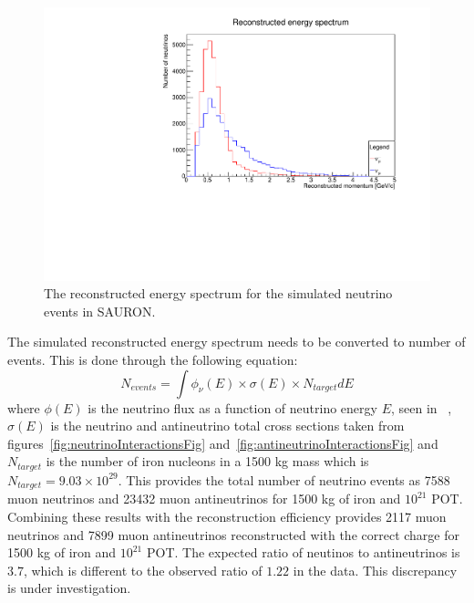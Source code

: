 \begin{figure}[h!]
\centering
\includegraphics[width=.9\textwidth]{figures/NeutrinoChap/ReconstructedESpectrum.pdf}
\caption{The reconstructed energy spectrum for the simulated neutrino events in SAURON.}
\label{fig:SimuSpectrum}
\end{figure}

The simulated reconstructed energy spectrum needs to be converted to number of events. This is done through the following equation:
\begin{equation}
N_{events} = \int \phi_\nu(E) \times \sigma(E) \times N_{target} dE
\end{equation}
where $\phi(E)$  is the neutrino flux as a function of neutrino energy $E$, seen in ~, $\sigma(E)$ is the neutrino and antineutrino total cross sections taken from figures~\ref{fig:neutrinoInteractionsFig} and~\ref{fig:antineutrinoInteractionsFig} and $N_{target}$ is the number of iron nucleons in a 1500 kg mass which is $N_{target}=9.03 \times 10^{29}$. This provides the total number of neutrino events as 7588 muon neutrinos and 23432 muon antineutrinos for 1500 kg of iron and $10^{21}$ POT. Combining these results with the reconstruction efficiency provides 2117 muon neutrinos and 7899 muon antineutrinos reconstructed with the correct charge for 1500 kg of iron and $10^{21}$ POT. The expected ratio of neutinos to antineutrinos is $3.7$, which is different to the observed ratio of $1.22$ in the data. This discrepancy is under investigation. 


